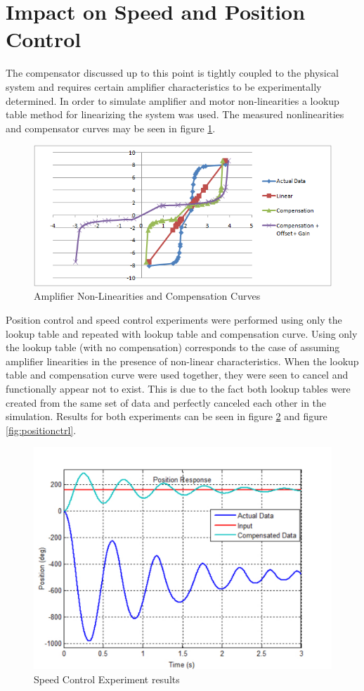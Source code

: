 \section{Impact on Speed and Position Control}

The compensator discussed up to this point is tightly coupled to the physical system and requires certain amplifier characteristics to be experimentally determined.
In order to simulate amplifier and motor non-linearities a lookup table method for linearizing the system was used.
The measured nonlinearities and compensator curves may be seen in figure \ref{fig:dataplots}.

\begin{figure}[ht]
    \centering
    \includegraphics[width=.80\textwidth]{images/DataPlots.png}
    \caption{Amplifier Non-Linearities and Compensation Curves}
    \label{fig:dataplots}
\end{figure}


Position control and speed control experiments were performed using only the lookup table and repeated with lookup table and compensation curve.
Using only the lookup table (with no compensation) corresponds to the case of assuming amplifier linearities in the presence of non-linear characteristics.
When the lookup table and compensation curve were used together, they were seen to cancel and functionally appear not to exist.
This is due to the fact both lookup tables were created from the same set of data and perfectly canceled each other in the simulation.
Results for both experiments can be seen in figure \ref{fig:speedctrl} and figure \ref{fig:positionctrl}.

\begin{figure}[ht]
    \centering
    \includegraphics[width=.75\textwidth]{images/HW2position.pdf}
    \caption{Speed Control Experiment results}
    \label{fig:speedctrl}
\end{figure}

